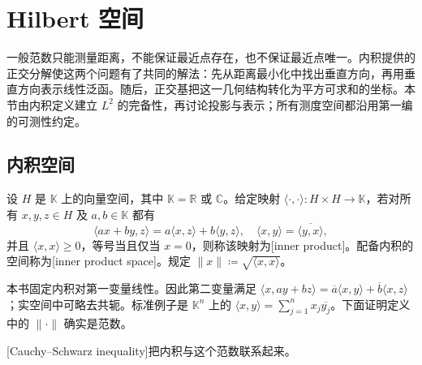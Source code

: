 \section{Hilbert 空间}
\label{b1:sec:0804}


一般范数只能测量距离，不能保证最近点存在，也不保证最近点唯一。内积提供的正交分解使这两个问题有了共同的解法：先从距离最小化中找出垂直方向，再用垂直方向表示线性泛函。随后，正交基把这一几何结构转化为平方可求和的坐标。本节由内积定义建立 \(L^2\) 的完备性，再讨论投影与表示；所有测度空间都沿用第一编的可测性约定。

\subsection{内积空间}
\label{b1:subsec:080401}

\begin{definition}\label{b1:def:inner-product}
设 \(H\) 是 \(\mathbb K\) 上的向量空间，其中 \(\mathbb K=\mathbb R\) 或 \(\mathbb C\)。给定映射 \(\langle\cdot,\cdot\rangle:H\times H\rightarrow\mathbb K\)，若对所有 \(x,y,z\in H\) 及 \(a,b\in\mathbb K\) 都有
\[
\langle ax+by,z\rangle=a\langle x,z\rangle+b\langle y,z\rangle,
\quad
\langle x,y\rangle=\overline{\langle y,x\rangle},
\]
并且 \(\langle x,x\rangle\geq0\)，等号当且仅当 \(x=0\)，则称该映射为[inner product]。配备内积的空间称为[inner product space]。规定 \(\|x\|\coloneqq\sqrt{\langle x,x\rangle}\)。
\end{definition}

本书固定内积对第一变量线性。因此第二变量满足 \(\langle x,ay+bz\rangle=\overline a\langle x,y\rangle+\overline b\langle x,z\rangle\)；实空间中可略去共轭。标准例子是 \(\mathbb K^n\) 上的 \(\langle x,y\rangle=\sum_{j=1}^nx_j\overline{y_j}\)。下面证明定义中的 \(\|\cdot\|\) 确实是范数。

\ProseParagraphBreak

[Cauchy--Schwarz inequality]把内积与这个范数联系起来。

